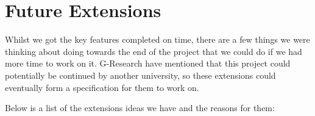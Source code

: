 \section{Future Extensions}

Whilst we got the key features completed on time, there are a few things we were 
thinking about doing towards the end of the project that we could do if we had
more time to work on it. G-Research have mentioned that this project could
potentially be continued by another university, so these extensions could
eventually form a specification for them to work on.

Below is a list of the extensions ideas we have and the reasons for them:


